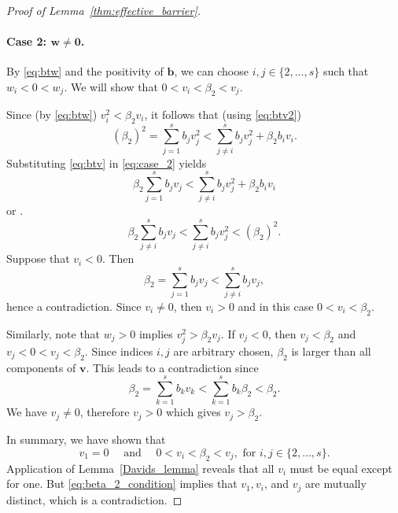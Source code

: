 \begin{proof}[Proof of Lemma~\ref{thm:effective_barrier}]
	\paragraph{Case 2: $\bm{w} \neq \bm{0}$.}
        By \eqref{eq:btw} and the positivity of $\bm{b}$,
	we can choose $i, j \in \{2, \dots, s\}$ such that $w_i < 0 < w_j$.
	We will show that $0 < v_i < \beta_2 < v_j$.

    Since (by \eqref{eq:btw}) $v_i^2 < \beta_2 v_i$, it follows that (using \eqref{eq:btv2})
    \begin{equation}\label{eq:case_2}
    		(\beta_2)^2 = \sum_{j=1}^s b_j v_j^2 < \sum_{j \neq i}^s b_j v_j^2 + \beta_2 b_i v_i.
    	\end{equation}
    	Substituting \eqref{eq:btv} in \eqref{eq:case_2} yields
    	\begin{equation}\label{case_2_b}
    		\beta_2\sum_{j=1}^s b_j v_j < \sum_{j \neq i}^s b_j v_j^2 + \beta_2 b_i v_i
    	\end{equation}
    	or .
    	\begin{equation}\label{case_2_c}
            \beta_2\sum_{j \neq i}^s b_j v_j < \sum_{j \neq i}^s b_j v_j^2 < (\beta_2)^2.
    \end{equation}
    Suppose that $v_{i} < 0$. Then
    \begin{equation*}
    		\beta_2 = \sum_{j=1}^s b_j v_j < \sum_{j \neq i}^s b_j v_j,
    	\end{equation*}
    	hence a contradiction. 
    	Since $v_i \neq 0$, then $v_i > 0$ and in this case $0 < v_i < \beta_2$.
    	
    	Similarly, note that $w_j > 0$ implies $v_j^2 > \beta_2 v_j$. 
    	If $v_j < 0$, then $v_j < \beta_2$ and $v_j < 0 < v_j < \beta_2$. 
    	Since indices $i, j$ are arbitrary chosen, $\beta_2$ is larger than all 
    	components of $\bm{v}$. 
    	This leads to a contradiction since
    	\begin{equation*}
    		\beta_2 = \sum_{k=1}^s b_k v_k < \sum_{k=1}^s b_k\beta_2 < \beta_2.
    	\end{equation*}
    	We have $v_j \neq 0$, therefore $v_j > 0$ which gives $v_j > \beta_2$.
    	
    	In summary, we have shown that
    	\begin{equation}\label{eq:beta_2_condition}
    		v_1 = 0 \quad \text{ and } \quad 0 < v_i < \beta_2 < v_j, \text{ for } i, j \in \{2, \dots, s\}.
    \end{equation}
    Application of Lemma~\ref{Davids_lemma} reveals that all $v_i$ must be equal except for one.
    But \eqref{eq:beta_2_condition} implies that $v_1, v_i$, and $v_j$ are mutually
    distinct, which is a contradiction.
\end{proof}
